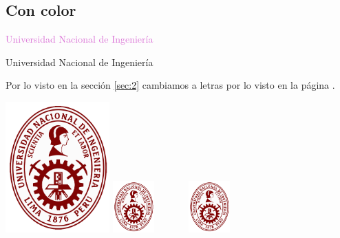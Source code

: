 \documentclass{article}
\begin{document}
\subsection{Con color}

\textcolor{Orchid}{Universidad Nacional de Ingeniería}

{\color{Peach} Universidad Nacional de Ingeniería}



\newpage

Por lo visto en la sección \ref{sec:2} cambiamos a letras por lo visto en la página \pageref{sec:2}.

\newpage

\includegraphics[width=4cm]{logo.png}			%
\includegraphics[height=2cm]{logo}				%
\includegraphics[width=4cm,height=2cm]{logo}	%
\end{document}
